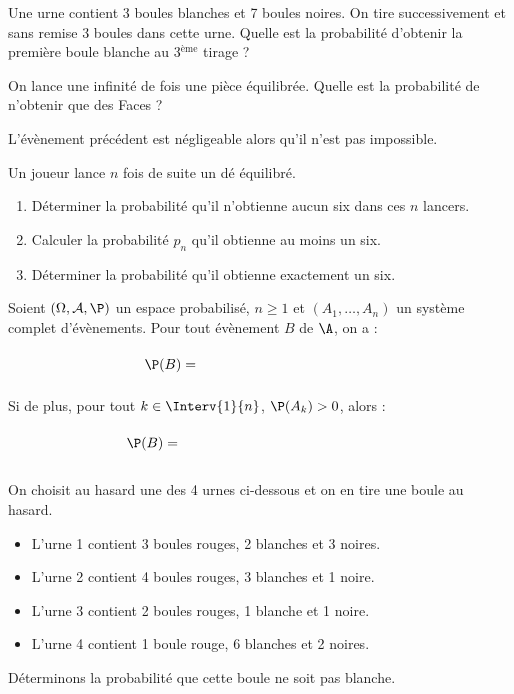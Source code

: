 \documentclass[a4paper,10pt]{report}
\begin{document}
\begin{ex} Une urne contient 3 boules blanches et 7 boules noires. On tire successivement et sans remise 3 boules dans cette urne. Quelle est la probabilité d'obtenir la première boule blanche au 3$^{\text{ème}}$ tirage ?

\vspace{4cm}
\end{ex}


\begin{ex} On lance une infinité de fois une pièce équilibrée. Quelle est la probabilité de n'obtenir que des Faces ?

\vspace{5cm}
\end{ex}


\begin{rem} L'évènement précédent est négligeable alors qu'il n'est pas impossible.
\end{rem}

\begin{exa} Un joueur lance $n$ fois de suite un dé équilibré.
 \begin{enumerate}
  \item Déterminer la probabilité qu'il n'obtienne aucun six dans ces $n$ lancers.
  \item Calculer la probabilité $p_n$ qu'il obtienne au moins un six.
  \item Déterminer la probabilité qu'il obtienne exactement un six.
 \end{enumerate}
 \end{exa}
 
\begin{thm}
Soient $(\Omega, \mathcal{A}, \P)$ un espace probabilisé, $n \geq 1$ et $(A_1, \ldots, A_n)$ un système complet d'évènements. Pour tout évènement $B$ de $\A$, on a :
$$ \P(B) = \phantom{blabbbbbbbbbbb\sum_{k=1}^n P(A_k \cap B)}$$
Si de plus, pour tout $k \in \Interv{1}{n}$, $\P(A_k) >0$, alors :
$$\P(B) = \phantom{blabbbbbbbbbbb \sum_{k=1}^n P(A_k) \times P_{A_k}(B)} $$
\end{thm}


\begin{ex} 
On choisit au hasard une des 4 urnes ci-dessous et on en tire une boule au hasard.
\begin{itemize}
 \item L'urne 1 contient 3 boules rouges, 2 blanches et 3 noires.
 \item L'urne 2 contient 4 boules rouges, 3 blanches et 1 noire.
 \item L'urne 3 contient 2 boules rouges, 1 blanche et 1 noire.
 \item L'urne 4 contient 1 boule rouge, 6 blanches et 2 noires.
\end{itemize}
Déterminons la probabilité que cette boule ne soit pas blanche.

\vspace{7cm}
\end{ex}
\end{document}
